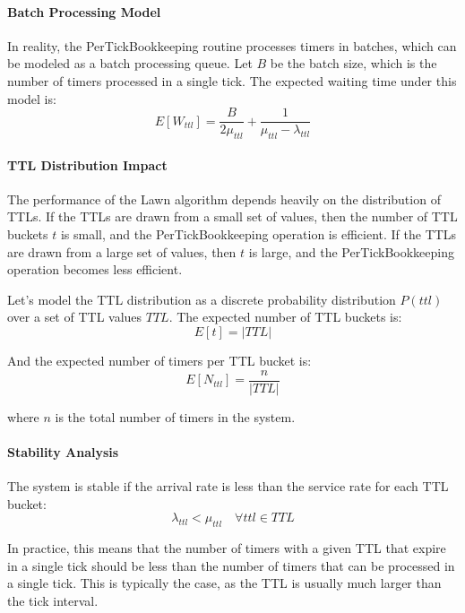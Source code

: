 \documentclass[conference]{IEEEtran}
\begin{document}
\paragraph{Batch Processing Model}
In reality, the PerTickBookkeeping routine processes timers in batches, which can be modeled as a batch processing queue. Let $B$ be the batch size, which is the number of timers processed in a single tick. The expected waiting time under this model is:
\begin{equation}
E[W_{ttl}] = \frac{B}{2\mu_{ttl}} + \frac{1}{\mu_{ttl} - \lambda_{ttl}}
\end{equation}

\paragraph{TTL Distribution Impact}
The performance of the Lawn algorithm depends heavily on the distribution of TTLs. If the TTLs are drawn from a small set of values, then the number of TTL buckets $t$ is small, and the PerTickBookkeeping operation is efficient. If the TTLs are drawn from a large set of values, then $t$ is large, and the PerTickBookkeeping operation becomes less efficient.

Let's model the TTL distribution as a discrete probability distribution $P(ttl)$ over a set of TTL values $TTL$. The expected number of TTL buckets is:
\begin{equation}
E[t] = |TTL|
\end{equation}

And the expected number of timers per TTL bucket is:
\begin{equation}
E[N_{ttl}] = \frac{n}{|TTL|}
\end{equation}

where $n$ is the total number of timers in the system.

\paragraph{Stability Analysis}
The system is stable if the arrival rate is less than the service rate for each TTL bucket:
\begin{equation}
\lambda_{ttl} < \mu_{ttl} \quad \forall ttl \in TTL
\end{equation}

In practice, this means that the number of timers with a given TTL that expire in a single tick should be less than the number of timers that can be processed in a single tick. This is typically the case, as the TTL is usually much larger than the tick interval.
\end{document}
